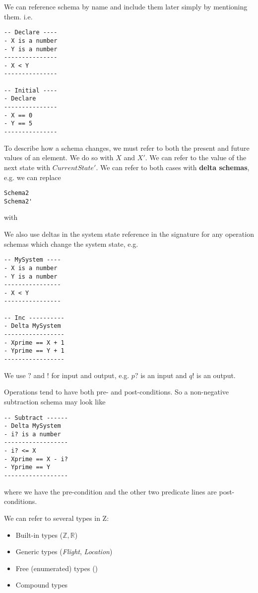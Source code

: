 \documentclass[12pt]{article}
\begin{document}
We can reference schema by name and include them later simply by mentioning them. i.e.
\begin{verbatim}
-- Declare ----
- X is a number
- Y is a number
---------------
- X < Y
---------------

-- Initial ----
- Declare
---------------
- X == 0
- Y == 5
---------------
\end{verbatim}

To describe how a schema changes, we must refer to both the present and future values of an element. We do so with $X$ and $X'$. We can refer to the value of the next state with $CurrentState'$. We can refer to both cases with {\bf delta schemas}, e.g. we can replace
\begin{verbatim}
Schema2
Schema2'
\end{verbatim}
with 

We also use deltas in the system state reference in the signature for any operation schemas which change the system state, e.g.
\begin{verbatim}
-- MySystem ----
- X is a number
- Y is a number
----------------
- X < Y
----------------

-- Inc ----------
- Delta MySystem
-----------------
- Xprime == X + 1
- Yprime == Y + 1
-----------------
\end{verbatim}

We use $?$ and $!$ for input and output, e.g. $p?$ is an input and $q!$ is an output.

Operations tend to have both pre- and post-conditions. So a non-negative subtraction schema may look like
\begin{verbatim}
-- Subtract ------
- Delta MySystem
- i? is a number
------------------
- i? <= X
- Xprime == X - i?
- Yprime == Y
------------------
\end{verbatim}
where we have the pre-condition  and the other two predicate lines are post-conditions.

We can refer to several types in Z:
\begin{itemize}
\item Built-in types ($\mathbb{Z}, \mathbb{R}$)
\item Generic types ({\it Flight}, {\it Location})
\item Free (enumerated) types ()
\item Compound types
\end{itemize}
\end{document}
